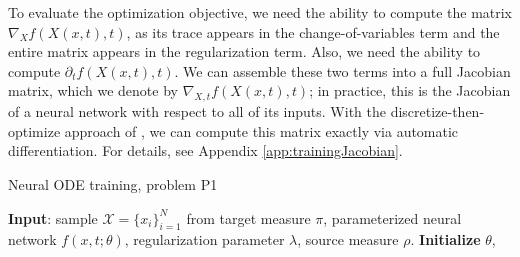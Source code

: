To evaluate the optimization objective, we need the ability to compute
the matrix $\nabla_X f(X(x,t),t)$, as its trace appears in the change-of-variables term and the entire matrix
appears in the regularization term. Also, we need the ability to compute
$\partial_t f(X(x,t),t)$. We can assemble these two terms
into a full Jacobian matrix, which we denote by
$\nabla_{X,t}f(X(x,t),t)$; in practice, this is the Jacobian of a neural network with respect to all of its inputs. With the
discretize-then-optimize approach of \cite{OTFlow}, we can compute
this matrix exactly via automatic differentiation. For details, see Appendix \ref{app:trainingJacobian}.

\begin{algorithm}
  \caption{Neural ODE training, problem P1}
  \label{algo1}
  \begin{algorithmic}[1]
    \STATE \textbf{Input}: sample $\mathcal{X} = \{ x_i\}_{i=1}^N$ from target
    measure $\pi$, parameterized neural network $f(x,t ; \theta)$,
    regularization parameter $\lambda$, source measure $\rho$.
    \STATE\textbf{Initialize} $\theta$, 
     \ENDWHILE
  \end{algorithmic}
\end{algorithm}












